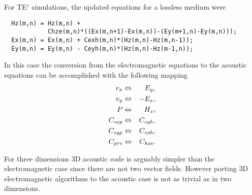 For TE$^z$ simulations, the updated equations for a lossless medium
were
\begin{verbatim}
  Hz(m,n) = Hz(m,n) +
            Chze(m,n)*((Ex(m,n+1)-Ex(m,n))-(Ey(m+1,n)-Ey(m,n)));
  Ex(m,n) = Ex(m,n) + Cexh(m,n)*(Hz(m,n)-Hz(m,n-1));
  Ey(m,n) = Ey(m,n) - Ceyh(m,n)*(Hz(m,n)-Hz(m-1,n));
\end{verbatim}
In this case the conversion from the electromagnetic equations to the
acoustic equations can be accomplished with the following mapping
\begin{eqnarray}
  v_x &\Leftrightarrow& E_y, \\
  v_y &\Leftrightarrow& -E_x, \\
  P   &\Leftrightarrow& H_z,\\
  C_{\mathit{vxp}} &\Leftrightarrow& C_{\mathit{eyh}}, \\
  C_{\mathit{vyp}} &\Leftrightarrow& C_{\mathit{exh}}, \\
  C_{\mathit{prv}} &\Leftrightarrow& C_{\mathit{hxe}}.
\end{eqnarray}

For three dimensions 3D acoustic code is arguably simpler than the
electromagnetic case since there are not two vector fields.  However
porting 3D electromagnetic algorithms to the acoustic case is not as
trivial as in two dimensions.
